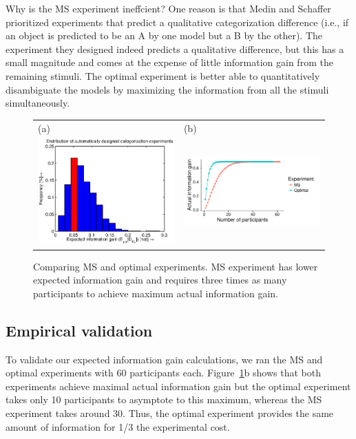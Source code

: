 \documentclass{article}
\begin{document}
Why is the MS experiment ineffcient?
One reason is that Medin and Schaffer prioritized experiments that predict a qualitative categorization difference (i.e., if an object is predicted to be an A by one model but a B by the other).
The experiment they designed indeed predicts a qualitative difference, but this has a small magnitude and comes at the expense of little information gain from the remaining stimuli.
The optimal experiment is better able to quantitatively disambiguate the models by maximizing the information from all the stimuli simultaneously.

\begin{figure}[t]
\centering
\begin{tabular}{l l}
(a) & (b)\\
\includegraphics[width=2.5in]{img/dist.eps} & \includegraphics[width=2.5in]{img/category-ns.pdf}\\
\end{tabular}
\caption{Comparing MS and optimal experiments. MS experiment has lower expected information gain and requires three times as many participants to achieve maximum actual information gain.}
\label{fig:dist}
\end{figure}

\subsection{Empirical validation}

To validate our expected information gain calculations, we ran the MS and optimal experiments with 60 participants each.
Figure~\ref{fig:dist}b shows that both experiments achieve maximal actual information gain but the optimal experiment takes only 10 participants to asymptote to this maximum, whereas the MS experiment takes around 30.
Thus, the optimal experiment provides the same amount of information for 1/3 the experimental cost.
\end{document}
